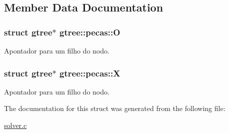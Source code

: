 \subsection{Member Data Documentation}
\hypertarget{structgtree_1_1pecas_a7ca95b444632a7083c1a4ff3a79662a2}{
\subsubsection[{O}]{\setlength{\rightskip}{0pt plus 5cm}struct {\bf gtree}$\ast$ gtree\+::pecas\+::\+O}}\label{structgtree_1_1pecas_a7ca95b444632a7083c1a4ff3a79662a2}
Apontador para um filho do nodo. \hypertarget{structgtree_1_1pecas_a91807e036e47beeb03a1868267d9ae58}{
\subsubsection[{X}]{\setlength{\rightskip}{0pt plus 5cm}struct {\bf gtree}$\ast$ gtree\+::pecas\+::\+X}}\label{structgtree_1_1pecas_a91807e036e47beeb03a1868267d9ae58}
Apontador para um filho do nodo. 

The documentation for this struct was generated from the following file\+:\begin{DoxyCompactItemize}
\item 
\hyperlink{solver_8c}{solver.\+c}\end{DoxyCompactItemize}
